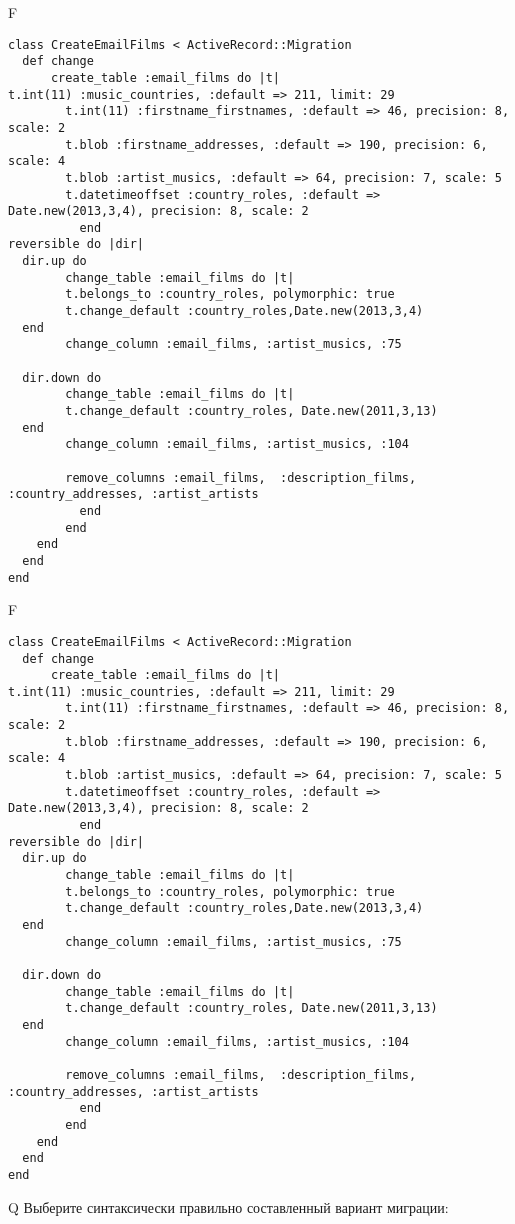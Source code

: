 F
\begin{verbatim}
class CreateEmailFilms < ActiveRecord::Migration
  def change
	  create_table :email_films do |t|
t.int(11) :music_countries, :default => 211, limit: 29
		t.int(11) :firstname_firstnames, :default => 46, precision: 8, scale: 2
		t.blob :firstname_addresses, :default => 190, precision: 6, scale: 4
		t.blob :artist_musics, :default => 64, precision: 7, scale: 5
		t.datetimeoffset :country_roles, :default => Date.new(2013,3,4), precision: 8, scale: 2
		  end
reversible do |dir|
  dir.up do
		change_table :email_films do |t|
		t.belongs_to :country_roles, polymorphic: true
 		t.change_default :country_roles,Date.new(2013,3,4)
  end
 		change_column :email_films, :artist_musics, :75
   
  dir.down do
		change_table :email_films do |t|
		t.change_default :country_roles, Date.new(2011,3,13)
  end
 		change_column :email_films, :artist_musics, :104
   
		remove_columns :email_films,  :description_films, :country_addresses, :artist_artists 
	      end
	    end
    end 
  end
end

\end{verbatim}

F
\begin{verbatim}
class CreateEmailFilms < ActiveRecord::Migration
  def change
	  create_table :email_films do |t|
t.int(11) :music_countries, :default => 211, limit: 29
		t.int(11) :firstname_firstnames, :default => 46, precision: 8, scale: 2
		t.blob :firstname_addresses, :default => 190, precision: 6, scale: 4
		t.blob :artist_musics, :default => 64, precision: 7, scale: 5
		t.datetimeoffset :country_roles, :default => Date.new(2013,3,4), precision: 8, scale: 2
		  end
reversible do |dir|
  dir.up do
		change_table :email_films do |t|
		t.belongs_to :country_roles, polymorphic: true
 		t.change_default :country_roles,Date.new(2013,3,4)
  end
 		change_column :email_films, :artist_musics, :75
   
  dir.down do
		change_table :email_films do |t|
		t.change_default :country_roles, Date.new(2011,3,13)
  end
 		change_column :email_films, :artist_musics, :104
   
		remove_columns :email_films,  :description_films, :country_addresses, :artist_artists 
	      end
	    end
    end 
  end
end

\end{verbatim}

Q
Выберите синтаксически правильно составленный вариант миграции:

